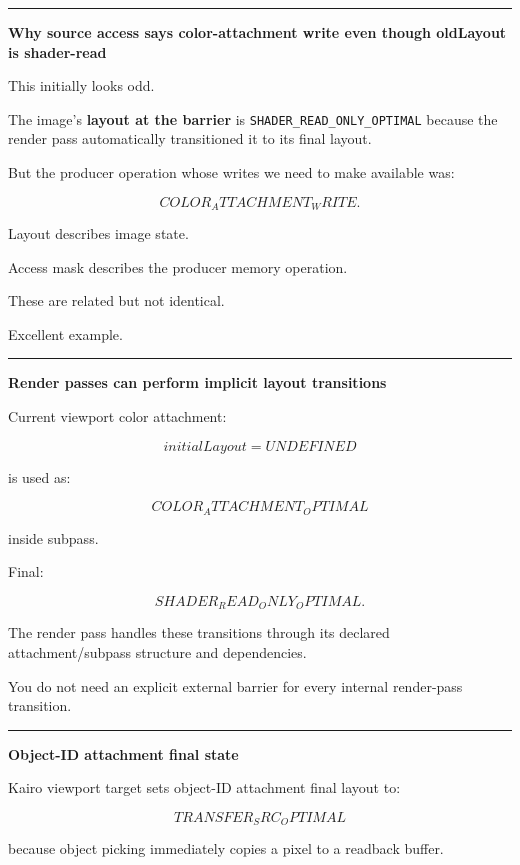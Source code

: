 \begin{center}\rule{0.5\linewidth}{0.5pt}\end{center}

\textbf{Why source access says color-attachment write even though oldLayout is shader-read}

This initially looks odd.

The image's \textbf{layout at the barrier} is \texttt{SHADER\_READ\_ONLY\_OPTIMAL} because the render pass automatically transitioned it to its final layout.

But the producer operation whose writes we need to make available was:

\[
COLOR_ATTACHMENT_WRITE.
\]

Layout describes image state.

Access mask describes the producer memory operation.

These are related but not identical.

Excellent example.

\begin{center}\rule{0.5\linewidth}{0.5pt}\end{center}

\textbf{Render passes can perform implicit layout transitions}

Current viewport color attachment:

\[
initialLayout=UNDEFINED
\]

is used as:

\[
COLOR_ATTACHMENT_OPTIMAL
\]

inside subpass.

Final:

\[
SHADER_READ_ONLY_OPTIMAL.
\]

The render pass handles these transitions through its declared attachment/subpass structure and dependencies.

You do not need an explicit external barrier for every internal render-pass transition.

\begin{center}\rule{0.5\linewidth}{0.5pt}\end{center}

\textbf{Object-ID attachment final state}

Kairo viewport target sets object-ID attachment final layout to:

\[
\boxed{
TRANSFER_SRC_OPTIMAL
}
\]

because object picking immediately copies a pixel to a readback buffer.

